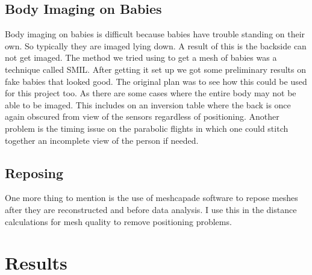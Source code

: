 \section{Body Imaging on Babies}
Body imaging on babies is difficult because babies have trouble standing on their own. So typically they are imaged lying down. A result of this is the backside can not get imaged. The method we tried using to get a mesh of babies was a technique called SMIL\cite{hesse2018learning}. After getting it set up we got some preliminary results on fake babies that looked good. The original plan was to see how this could be used for this project too. As there are some cases where the entire body may not be able to be imaged. This includes on an inversion table where the back is once again obscured from view of the sensors regardless of positioning. Another problem is the timing issue on the parabolic flights in which one could stitch together an incomplete view of the person if needed.

\section{Reposing}
One more thing to mention is the use of meshcapade software to repose meshes after they are reconstructed and before data analysis. I use this in the distance calculations for mesh quality to remove positioning problems.
\chapter{Results}
